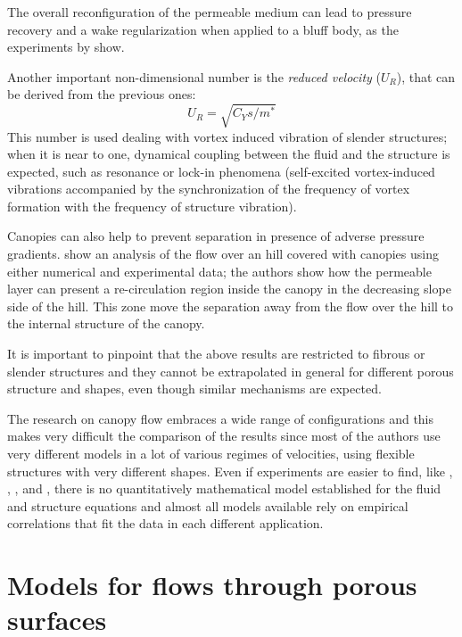 The overall reconfiguration of the permeable medium can lead to pressure recovery and a wake regularization when applied to a bluff body, as the experiments by \citet{gosselin2011drag} show.

Another important non-dimensional number is the \textit{reduced velocity} ($U_R$), that can be derived from the previous ones:
$$ U_R = \sqrt{C_Y s / m^*}$$
This number is used dealing with vortex induced vibration of slender structures; when it is near to one, dynamical coupling between the fluid and the structure is expected, such as resonance or lock-in phenomena (self-excited vortex-induced vibrations accompanied by the synchronization of the frequency of vortex formation with the frequency of structure vibration).

Canopies can also help to prevent separation in presence of adverse pressure gradients. \citet{belcher2012wind} show an analysis of the flow over an hill covered with canopies using either numerical and experimental data; the authors show how the permeable layer can present a re-circulation region inside the canopy in the decreasing slope side of the hill. This zone move the separation away from the flow over the hill to the internal structure of the canopy.

It is important to pinpoint that the above results are restricted to fibrous or slender structures and they cannot be extrapolated in general for different porous structure and shapes, even though similar mechanisms are expected.

The research on canopy flow embraces a wide range of configurations and this makes very difficult the comparison of the results since most of the authors use very different models in a lot of various regimes of velocities, using flexible structures with very different shapes.
Even if experiments are easier to find, like \citet{segalini2011experimental}, \citet{segalini2013scaling}, \citet{maza2013coupled}, \citet{barsu2016drag} and \citet{alvarado2017nature}, there is no quantitatively mathematical model established for the fluid and structure equations and almost all models available rely on empirical correlations that fit the data in each different application.


\section{Models for flows through porous surfaces}
\label{ch:model_porous}

